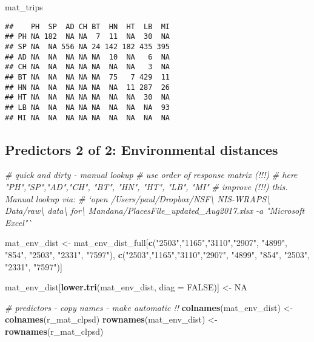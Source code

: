 \documentclass[]{article}
\newenvironment{Shaded}{\begin{snugshade}}{\end{snugshade}}
\newcommand{\KeywordTok}[1]{\textcolor[rgb]{0.13,0.29,0.53}{\textbf{#1}}}
\newcommand{\DataTypeTok}[1]{\textcolor[rgb]{0.13,0.29,0.53}{#1}}
\newcommand{\StringTok}[1]{\textcolor[rgb]{0.31,0.60,0.02}{#1}}
\newcommand{\CommentTok}[1]{\textcolor[rgb]{0.56,0.35,0.01}{\textit{#1}}}
\newcommand{\OtherTok}[1]{\textcolor[rgb]{0.56,0.35,0.01}{#1}}
\newcommand{\NormalTok}[1]{#1}
\begin{document}
\begin{Shaded}
\begin{Highlighting}[]
\NormalTok{mat_trips}
\end{Highlighting}
\end{Shaded}

\begin{verbatim}
##    PH  SP  AD CH BT  HN  HT  LB  MI
## PH NA 182  NA NA  7  11  NA  30  NA
## SP NA  NA 556 NA 24 142 182 435 395
## AD NA  NA  NA NA NA  10  NA   6  NA
## CH NA  NA  NA NA NA  NA  NA   3  NA
## BT NA  NA  NA NA NA  75   7 429  11
## HN NA  NA  NA NA NA  NA  11 287  26
## HT NA  NA  NA NA NA  NA  NA  30  NA
## LB NA  NA  NA NA NA  NA  NA  NA  93
## MI NA  NA  NA NA NA  NA  NA  NA  NA
\end{verbatim}

\subsection{Predictors 2 of 2: Environmental
distances}\label{predictors-2-of-2-environmental-distances-1}

\begin{Shaded}
\begin{Highlighting}[]
\CommentTok{# quick and dirty - manual lookup}
\CommentTok{#   use order  of response matrix (!!!)}
\CommentTok{#   here "PH","SP","AD","CH", "BT", "HN", "HT", "LB", "MI"}
\CommentTok{#   improve (!!!) this. Manual lookup via:}
\CommentTok{#   `open /Users/paul/Dropbox/NSF\textbackslash{} NIS-WRAPS\textbackslash{} Data/raw\textbackslash{} data\textbackslash{} for\textbackslash{} Mandana/PlacesFile_updated_Aug2017.xlsx -a "Microsoft Excel"`}

\NormalTok{mat_env_dist <-}\StringTok{ }\NormalTok{mat_env_dist_full[}\KeywordTok{c}\NormalTok{(}\StringTok{"2503"}\NormalTok{,}\StringTok{"1165"}\NormalTok{,}\StringTok{"3110"}\NormalTok{,}\StringTok{"2907"}\NormalTok{, }\StringTok{"4899"}\NormalTok{, }\StringTok{"854"}\NormalTok{, }\StringTok{"2503"}\NormalTok{, }\StringTok{"2331"}\NormalTok{, }\StringTok{"7597"}\NormalTok{),}
                                  \KeywordTok{c}\NormalTok{(}\StringTok{"2503"}\NormalTok{,}\StringTok{"1165"}\NormalTok{,}\StringTok{"3110"}\NormalTok{,}\StringTok{"2907"}\NormalTok{, }\StringTok{"4899"}\NormalTok{, }\StringTok{"854"}\NormalTok{, }\StringTok{"2503"}\NormalTok{, }\StringTok{"2331"}\NormalTok{, }\StringTok{"7597"}\NormalTok{)] }

\NormalTok{mat_env_dist[}\KeywordTok{lower.tri}\NormalTok{(mat_env_dist, }\DataTypeTok{diag =} \OtherTok{FALSE}\NormalTok{)] <-}\StringTok{ }\OtherTok{NA}

\CommentTok{# predictors - copy names - make automatic !! }
\KeywordTok{colnames}\NormalTok{(mat_env_dist) <-}\StringTok{ }\KeywordTok{colnames}\NormalTok{(r_mat_clpsd)}
\KeywordTok{rownames}\NormalTok{(mat_env_dist) <-}\StringTok{ }\KeywordTok{rownames}\NormalTok{(r_mat_clpsd)}
\end{Highlighting}
\end{Shaded}
\end{document}
